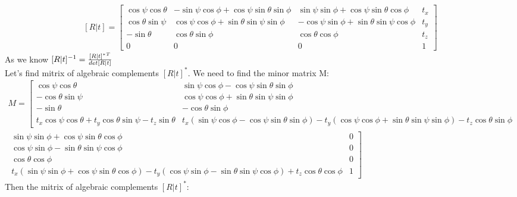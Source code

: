 \documentclass[a4paper, twoside, english]{article}
\begin{document}
\begin{equation*}
	\begin{gathered}
		[R|t]= \left[
		\begin{array}{cccc}
			\cos\psi\cos\theta & -\sin\psi\cos\phi+\cos\psi\sin\theta\sin\phi & \sin\psi\sin\phi+\cos\psi\sin\theta\cos\phi & t_x\\
			\cos\theta\sin\psi & \cos\psi\cos\phi+\sin\theta\sin\psi\sin\phi  & -\cos\psi\sin\phi+\sin\theta\sin\psi\cos\phi & t_y\\
			-\sin\theta & \cos\theta\sin\phi & \cos\theta\cos\phi & t_z \\
			0&0&0&1
		\end{array}
		\right] 		
	\end{gathered}
\end{equation*}
As we know ${[R|t]^{-1}}={{{[R|t]^*}^T}\over{det[R|t]}}$\\
Let's find mitrix of algebraic complements $[R|t]^{*}$. We need to find the minor matrix M:\\
\tiny
\begin{equation*}
	\begin{gathered}
	M=\left[
\begin{array}{cccc}
	\cos\psi\cos\theta & \sin\psi\cos\phi-\cos\psi\sin\theta\sin\phi \\
	-\cos\theta\sin\psi & \cos\psi\cos\phi+\sin\theta\sin\psi\sin\phi \\
	-\sin\theta & -\cos\theta\sin\phi& \\
	t_x\cos\psi\cos\theta + t_y\cos\theta\sin\psi - t_z\sin\theta & t_x(\sin\psi\cos\phi-\cos\psi\sin\theta\sin\phi) -t_y(\cos\psi\cos\phi+\sin\theta\sin\psi\sin\phi) -t_z\cos\theta\sin\phi 
\end{array}
\right. \\
\left.
\begin{array}{cccc}
	 \sin\psi\sin\phi+\cos\psi\sin\theta\cos\phi & 0\\
	 \cos\psi\sin\phi-\sin\theta\sin\psi\cos\phi & 0\\
	 \cos\theta\cos\phi & 0\\
	 t_x(\sin\psi\sin\phi+\cos\psi\sin\theta\cos\phi)-t_y(\cos\psi\sin\phi-\sin\theta\sin\psi\cos\phi) + t_z\cos\theta\cos\phi&1
\end{array}
\right]
	\end{gathered}
\end{equation*}
\normalsize
Then the mitrix of algebraic complements $[R|t]^{*}$:
\tiny
\end{document}
